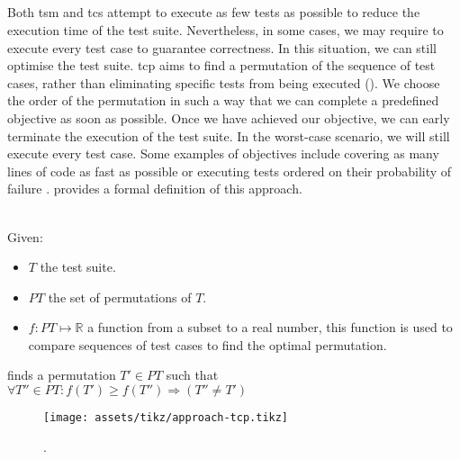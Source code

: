 
\subsection{\tcp{}}
Both \acrshort{tsm} and \acrshort{tcs} attempt to execute as few tests as possible to reduce the execution time of the test suite. Nevertheless, in some cases, we may require to execute every test case to guarantee correctness. In this situation, we can still optimise the test suite. \acrfull{tcp} aims to find a permutation of the sequence of test cases, rather than eliminating specific tests from being executed (). We choose the order of the permutation in such a way that we can complete a predefined objective as soon as possible. Once we have achieved our objective, we can early terminate the execution of the test suite. In the worst-case scenario, we will still execute every test case. Some examples of objectives include covering as many lines of code as fast as possible or executing tests ordered on their probability of failure \cite{10.1002/stv.430}.  provides a formal definition of this approach.

\begin{definition}[\tcp{}]
\label{def:tcp}
\mbox{}\\Given:
\begin{itemize}
	\item $T$ the test suite.
	\item $PT$ the set of permutations of $T$.
	\item $f: PT \mapsto \mathbb{R}$ a function from a subset to a real number, this function is used to compare sequences of test cases to find the optimal permutation.
\end{itemize}

\noindent \tcp{} finds a permutation $T' \in PT$ such that $\forall T'' \in PT : f(T') \ge f(T'') \Rightarrow (T'' \ne T')$ 
\end{definition}

\begin{figure}[htbp!]
	\centering
	\texttt{[image: assets/tikz/approach-tcp.tikz]}
	\caption{\tcp{}.}
	\label{fig:tcp}
\end{figure}